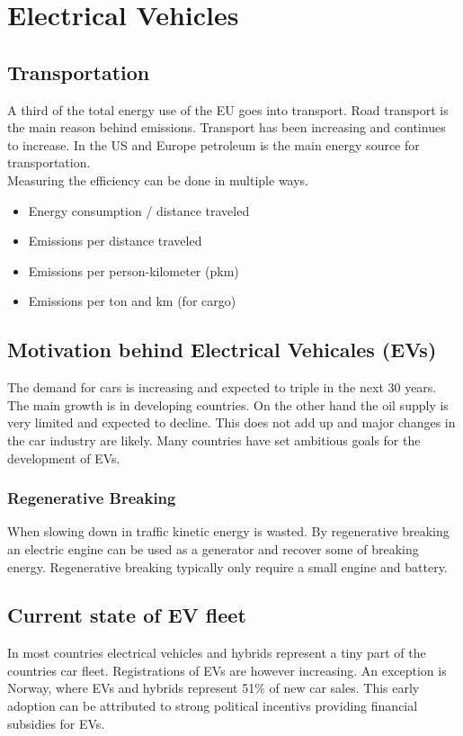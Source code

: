 \section{Electrical Vehicles}

\subsection{Transportation}
A third of the total energy use of the EU goes into transport.
Road transport is the main reason behind emissions.
Transport has been increasing and continues to increase.
In the US and Europe petroleum is the main energy source for transportation.\\

Measuring the efficiency can be done in multiple ways.

\begin{itemize}
    \item Energy consumption / distance traveled
    \item Emissions per distance traveled
    \item Emissions per person-kilometer (pkm)
    \item Emissions per ton and km (for cargo)
\end{itemize}

\subsection{Motivation behind Electrical Vehicales (EVs)}
The demand for cars is increasing and expected to triple in the next 30 years.
The main growth is in developing countries.
On the other hand the oil supply is very limited and expected to decline.
This does not add up and major changes in the car industry are likely.
Many countries have set ambitious goals for the development of EVs.

\subsubsection{Regenerative Breaking}
When slowing down in traffic kinetic energy is wasted.
By regenerative breaking an electric engine can be used as a generator and recover some of breaking energy.
Regenerative breaking typically only require a small engine and battery.

\subsection{Current state of EV fleet}
In most countries electrical vehicles and hybrids represent a tiny part of the countries car fleet.
Registrations of EVs are however increasing.
An exception is Norway, where EVs and hybrids represent 51\% of new car sales.
This early adoption can be attributed to strong political incentivs providing financial subsidies for EVs.

